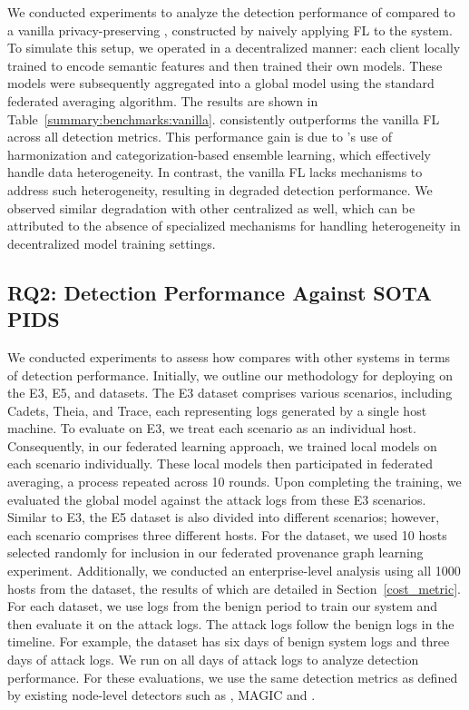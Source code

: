 We conducted experiments to analyze the detection performance of \Sys compared to a vanilla privacy-preserving \pids, constructed by naively applying FL to the \flash system. To simulate this setup, we operated \flash in a decentralized manner: each client locally trained \wordvec to encode semantic features and then trained their own \gnnshort models. These models were subsequently aggregated into a global model using the standard federated averaging algorithm. The results are shown in Table~\ref{summary:benchmarks:vanilla}. \Sys consistently outperforms the vanilla FL \flash across all detection metrics. This performance gain is due to \Sys’s use of \wordvec harmonization and categorization-based ensemble learning, which effectively handle data heterogeneity. In contrast, the vanilla FL \flash lacks mechanisms to address such heterogeneity, resulting in degraded detection performance. We observed similar degradation with other centralized \pids as well, which can be attributed to the absence of specialized mechanisms for handling heterogeneity in decentralized model training settings.

 \subsection{RQ2: Detection Performance Against SOTA PIDS}
 \label{sub:detect:perf}


We conducted experiments to assess how \Sys compares with other systems in terms of detection performance. Initially, we outline our methodology for deploying \Sys on the \darpa E3, E5, and \optc datasets. The E3 dataset comprises various scenarios, including Cadets, Theia, and Trace, each representing logs generated by a single host machine. To evaluate \Sys on E3, we treat each scenario as an individual host. Consequently, in our federated learning approach, we trained local \gnnshort models on each scenario individually. These local models then participated in federated averaging, a process repeated across 10 rounds. Upon completing the training, we evaluated the global \gnnshort model against the attack logs from these E3 scenarios. Similar to E3, the E5 dataset is also divided into different scenarios; however, each scenario comprises three different hosts. For the \optc dataset, we used 10 hosts selected randomly for inclusion in our federated provenance graph learning experiment. Additionally, we conducted an enterprise-level analysis using all 1000 hosts from the \optc dataset, the results of which are detailed in Section~\ref{cost_metric}. For each dataset, we use logs from the benign period to train our system and then evaluate it on the attack logs. The attack logs follow the benign logs in the timeline. For example, the \optc dataset has six days of benign system logs and three days of attack logs. We run \Sys on all days of attack logs to analyze detection performance. For these evaluations, we use the same detection metrics as defined by existing node-level detectors such as \threatrace, MAGIC and \flash.

